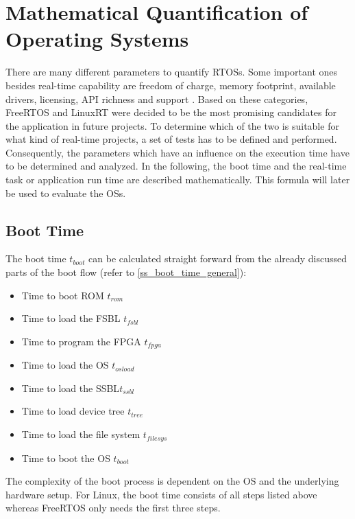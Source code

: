 \section{Mathematical Quantification of Operating Systems}
There are many different parameters to quantify \acp{RTOS}.
Some important ones besides real-time capability are freedom of charge, memory footprint, available drivers, licensing, \ac{API} richness and support \cite{Anh:sapeortosfsm}.   
Based on these categories, FreeRTOS and LinuxRT were decided to be the most promising candidates for the application in future projects.
To determine which of the two is suitable for what kind of real-time projects, a set of tests has to be defined and performed.
Consequently, the parameters which have an influence on the execution time have to be determined and analyzed.
In the following, the boot time and the real-time task or application run time are described mathematically.
This formula will later be used to evaluate the \acp{OS}.

\subsection{Boot Time}\label{ss_boot_time_math}
The boot time $ t_{boot} $ can be calculated straight forward from the already discussed parts of the boot flow (refer to \ref{ss_boot_time_general}):
\begin{itemize}
	\item Time to boot \ac{ROM} $ t_{rom} $
	\item Time to load the \ac{FSBL} $ t_{fsbl} $
	\item Time to program the \ac{FPGA} $ t_{fpga} $
	\item Time to load the \ac{OS} $ t_{osload} $
	\item Time to load the \ac{SSBL}$ t_{ssbl} $ 
	\item Time to load device tree $t_{tree} $
	\item Time to load the file system $ t_{filesys}$
	\item Time to boot the \ac{OS} $ t_{boot} $
\end{itemize} 
The complexity of the boot process is dependent on the \ac{OS} and the underlying hardware setup.
For Linux, the boot time consists of all steps listed above whereas FreeRTOS only needs the first three steps. 
  
